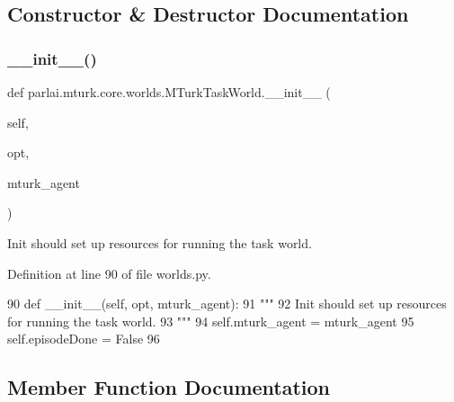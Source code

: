 \subsection{Constructor \& Destructor Documentation}
\mbox{\label{classparlai_1_1mturk_1_1core_1_1worlds_1_1MTurkTaskWorld_a7aee41b0411b618882dbad31b8c6209a}} 
\subsubsection{\texorpdfstring{\+\_\+\+\_\+init\+\_\+\+\_\+()}{\_\_init\_\_()}}
{\footnotesize\ttfamily def parlai.\+mturk.\+core.\+worlds.\+M\+Turk\+Task\+World.\+\_\+\+\_\+init\+\_\+\+\_\+ (\begin{DoxyParamCaption}\item[{}]{self,  }\item[{}]{opt,  }\item[{}]{mturk\+\_\+agent }\end{DoxyParamCaption})}

\begin{DoxyVerb}Init should set up resources for running the task world.
\end{DoxyVerb}
 

Definition at line 90 of file worlds.\+py.


\begin{DoxyCode}
90     \textcolor{keyword}{def }\_\_init\_\_(self, opt, mturk\_agent):
91         \textcolor{stringliteral}{"""}
92 \textcolor{stringliteral}{        Init should set up resources for running the task world.}
93 \textcolor{stringliteral}{        """}
94         self.mturk\_agent = mturk\_agent
95         self.episodeDone = \textcolor{keyword}{False}
96 
\end{DoxyCode}


\subsection{Member Function Documentation}
\mbox{\label{classparlai_1_1mturk_1_1core_1_1worlds_1_1MTurkTaskWorld_a9199b698134e0b6e83951ef10b9b25be}} 
